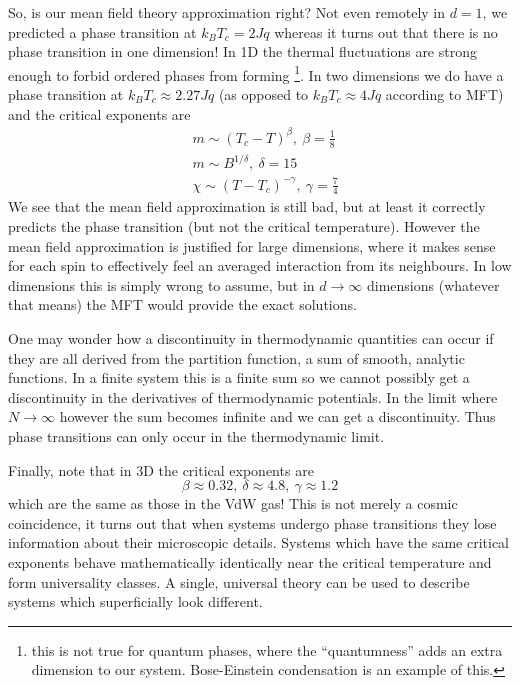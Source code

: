 \documentclass[a4paper,11pt,oneside]{book}
\begin{document}
So, is our mean field theory approximation right? Not even remotely in $d=1$, we predicted a phase transition at $k_BT_c = 2Jq$ whereas it turns out that there is no phase transition in one dimension! In 1D the thermal fluctuations are strong enough to forbid ordered phases from forming \footnote{this is not true for quantum phases, where the \enquote{quantumness} adds an extra dimension to our system. Bose-Einstein condensation is an example of this.}. In two dimensions we do have a phase transition at $k_B T_c \approx 2.27 Jq$ (as opposed to $k_B T_c \approx 4 Jq$ according to MFT) and the critical exponents are 
\begin{align}
    &m \sim (T_c-T)^\beta , \ \beta= \frac{1}{8}\\ 
    &m \sim B^{1/\delta} , \ \delta= 15\\
    &\chi \sim (T-T_c)^{-\gamma}, \ \gamma = \frac{7}{4}
\end{align}
We see that the mean field approximation is still bad, but at least it correctly predicts the phase transition (but not the critical temperature). 
However the mean field approximation is justified for large dimensions, where it makes sense for each spin to effectively feel an averaged interaction from its neighbours. In low dimensions this is simply wrong to assume, but in $d\rightarrow \infty$ dimensions (whatever that means) the MFT would provide the exact solutions.

One may wonder how a discontinuity in thermodynamic quantities can occur if they are all derived from the partition function, a sum of smooth, analytic functions. In a finite system this is a finite sum so we cannot possibly get a discontinuity in the derivatives of thermodynamic potentials. In the limit where $N \rightarrow \infty$ however the sum becomes infinite and we can get a discontinuity. Thus phase transitions can only occur in the thermodynamic limit.

Finally, note that in 3D the critical exponents are 
\begin{equation}
    \beta \approx 0.32, \ \delta \approx 4.8, \ \gamma \approx 1.2
\end{equation}
which are the same as those in the VdW gas! This is not merely a cosmic coincidence, it turns out that when systems undergo phase transitions they lose information about their microscopic details. Systems which have the same critical exponents behave mathematically identically near the critical temperature and form universality classes. A single, universal theory can be used to describe systems which superficially look different.
\end{document}
